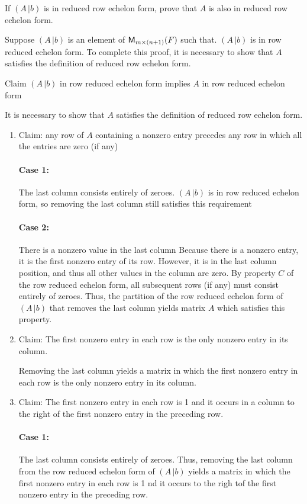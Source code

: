 If $(A\, | b)$ is in reduced row echelon form, prove that $A$ is
also in reduced row echelon form.

Suppose $(A\,|b)$ is an element of $\mathsf{M}_{m \times (n+1)}(F)$ such that. $(A\,|b)$ is in row reduced echelon form.  To
complete this proof, it is necessary to show that $A$ satisfies the
definition of reduced row echelon form.

Claim $(A\,|b)$ in row reduced echelon form implies $A$ in row reduced echelon form

It is necessary to show that $A$ satisfies the definition of reduced
row echelon form.

\begin{enumerate}
\item Claim: any row of $A$ containing a nonzero entry precedes any row in
which all the entries are zero (if any)
\paragraph{Case 1:} The last column consists entirely of zeroes.
$(A\,|b)$ is in row reduced echelon form, so removing the last column still satisfies this
requirement

\paragraph{Case 2:} There is a nonzero value in the last column
Because there is a nonzero entry, it is the first nonzero entry of its
row.  However, it is in the last column position, and thus all other values in
the column are zero.  By property $C$ of the row reduced echelon form, all subsequent rows (if any)
must consist entirely of zeroes. 
Thus, the partition of the row reduced
echelon form of $(A\,|b)$ that
removes the last column yields matrix $A$ which satisfies this property.

\item Claim: The first nonzero entry in each row is the only nonzero entry in
its column. 

Removing the last column yields a matrix in which the first nonzero entry
in each row is the only nonzero entry in its column.

\item Claim:  The first nonzero entry in each row is 1 and it occurs in a
column to the right of the first nonzero entry in the preceding row.

\paragraph{Case 1:} The last column consists entirely of zeroes.
Thus, removing the last column from the row reduced echelon form of $(A\,|b)$ yields a matrix in which the
first nonzero entry in each row is 1 nd it occurs to the righ tof the
first nonzero entry in the preceding row.


\end{enumerate}
